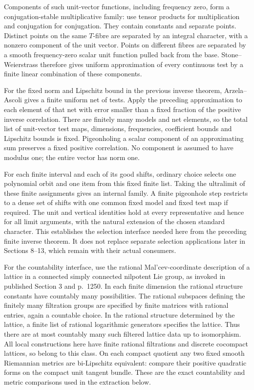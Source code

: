 \documentclass[11pt]{article}
\begin{document}
Components of such unit-vector functions, including frequency zero,
form a conjugation-stable multiplicative family: use tensor products
for multiplication and conjugation for conjugation. They contain
constants and separate points. Distinct points on the same $T$-fibre
are separated by an integral character, with a nonzero component of
the unit vector. Points on different fibres are separated by a smooth
frequency-zero scalar unit function pulled back from the base.
Stone--Weierstrass therefore gives uniform approximation of every
continuous test by a finite linear combination of these components.

For the fixed norm and Lipschitz bound in the previous inverse theorem,
Arzela--Ascoli gives a finite uniform net of tests. Apply the preceding
approximation to each element of that net with error smaller than a
fixed fraction of the positive inverse correlation. There are finitely
many models and net elements, so the total list of unit-vector test
maps, dimensions, frequencies, coefficient bounds and Lipschitz bounds
is fixed. Pigeonholing a scalar component of an approximating sum
preserves a fixed positive correlation. No component is assumed to
have modulus one; the entire vector has norm one.

For each finite interval and each of its good shifts, ordinary choice
selects one polynomial orbit and one item from this fixed finite list.
Taking the ultralimit of these finite assignments gives an internal
family. A finite pigeonhole step restricts to a dense set of shifts with
one common fixed model and fixed test map if required. The unit and
vertical identities hold at every representative and hence for all
limit arguments, with the natural extension of the chosen standard
character. This establishes the selection interface needed here from
the preceding finite inverse theorem. It does not replace separate
selection applications later in Sections 8--13, which remain with their
actual consumers.

For the countability interface, use the rational Mal'cev-coordinate
description of a lattice in a connected simply connected nilpotent Lie
group, as invoked in published Section 3 and p.~1250. In each finite
dimension the rational structure constants have countably many
possibilities. The rational subspaces defining the finitely many
filtration groups are specified by finite matrices with rational
entries, again a countable choice. In the rational structure determined
by the lattice, a finite list of rational logarithmic generators
specifies the lattice. Thus there are at most countably many such
filtered lattice data up to isomorphism. All local constructions here
have finite rational filtrations and discrete cocompact lattices, so
belong to this class. On each compact quotient any two fixed smooth
Riemannian metrics are bi-Lipschitz equivalent: compare their positive
quadratic forms on the compact unit tangent bundle. These are the exact
countability and metric comparisons used in the extraction below.
\end{document}
